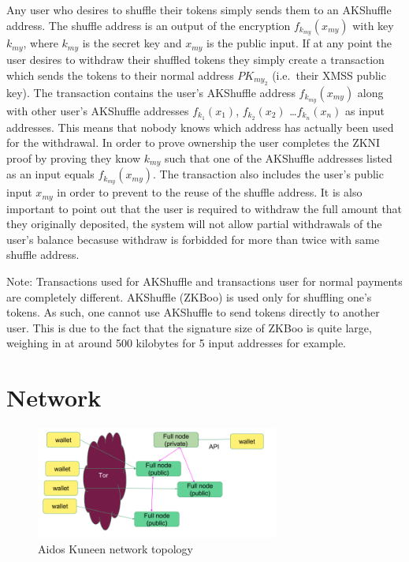\documentclass[a4paper,10pt,twocolumn]{article}
\begin{document}
Any user who desires to shuffle their tokens simply sends them to an AKShuffle address.
The shuffle address is an output of the encryption \( f_{k_{my}}(x_{my}) \) with key \( k_{my} \),  
where \(k_{my}\) is the secret key  and \(x_{my}\) is the public input.
If at any point the user desires to withdraw their shuffled tokens they simply create a transaction which sends the tokens to their 
normal address \(PK_{my_2}\) (i.e.\ their XMSS public key).
The transaction contains the user's AKShuffle address \( f_{k_{my}}(x_{my}) \) along with other user's AKShuffle addresses 
\( f_{k_{1}}(x_{1}) \), \( f_{k_{2}}(x_{2}) \) \dots \( f_{k_{n}}(x_{n}) \) as input addresses. 
This means that nobody knows which address has actually been used for the withdrawal. 
In order to prove ownership the user completes the ZKNI proof by proving they know \( k_{my} \) such that one of the AKShuffle 
addresses listed as an input equals \( f_{k_{my}}(x_{my}) \). 
The transaction also includes the user's public input \( x_{my} \) in order to prevent to the reuse of the shuffle address. It is also 
important to point out that the user is required to withdraw the full amount that they originally deposited, 
the system will not allow partial withdrawals of the user's balance becasuse withdraw is forbidded for more than twice with same shuffle address.

Note: Transactions used for AKShuffle and transactions user for normal payments are completely different. AKShuffle (ZKBoo) is used 
only for shuffling one's tokens. As such, one cannot use AKShuffle to send tokens directly to another user. This is due to the fact 
that the signature size of ZKBoo is quite large, weighing in at around 500 kilobytes for 5 input addresses for example.

\section{Network}
\label{sec:network}

\begin{figure}[ht]
	\begin{center}
	\includegraphics[width=80mm]{network.png}
	  \caption{Aidos Kuneen network topology}
    \label{fig:network}
	\end{center}
 \end{figure}
\end{document}
